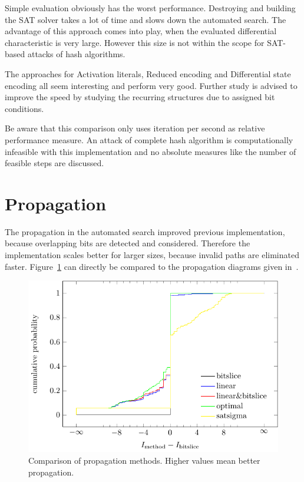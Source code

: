Simple evaluation obviously has the worst performance. Destroying and building the SAT solver takes a lot of time and slows down the automated search. The advantage of this approach comes into play, when the evaluated differential characteristic is very large. However this size is not within the scope for SAT-based attacks of hash algorithms.

The approaches for Activation literals, Reduced encoding and Differential state encoding all seem interesting and perform very good. Further study is advised to improve the speed by studying the recurring structures due to assigned bit conditions.

Be aware that this comparison only uses iteration per second as relative performance measure. An attack of complete hash algorithm is computationally infeasible with this implementation and no absolute measures like the number of feasible steps are discussed.

\section{Propagation}
%
The propagation in the automated search improved previous implementation, because overlapping bits are detected and considered. Therefore the implementation scales better for larger sizes, because invalid paths are eliminated faster. Figure~\ref{fig:sat-propagation} can directly be compared to the propagation diagrams given in~\cite{Cry16}.
%
\begin{figure}[t]
 \begin{center}
  \includegraphics{img/propagation.pdf}
  \caption[Comparison of propagation methods.]{Comparison of propagation methods. Higher values mean better propagation.}
  \label{fig:sat-propagation}
 \end{center}
\end{figure}

